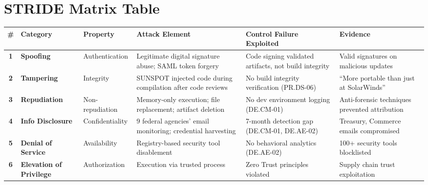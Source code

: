 \clearpage
\section{STRIDE Matrix Table}
\label{app:stride}

\begin{table}[h] %
    \centering
    \small
    \renewcommand{\arraystretch}{1.3}
    \begin{tabularx}{\textwidth}{>{\bfseries}c >{\bfseries}l l X X X}
        \toprule
        \# & Category & Property & Attack Element & Control Failure Exploited & Evidence \\
        \midrule
        1 & Spoofing & Authentication & Legitimate digital signature abuse; SAML token forgery & Code signing validated artifacts, not build integrity & Valid signatures on malicious updates \cite{fireeye_highly_2020} \\
        
        2 & Tampering & Integrity & SUNSPOT injected code during compilation after code reviews & No build integrity verification (PR.DS-06) & ``More portable than just at SolarWinds'' \cite{us_open_2021} \\
        
        3 & Repudiation & Non-repudiation & Memory-only execution; file replacement; artifact deletion & No dev environment logging (DE.CM-01) & Anti-forensic techniques prevented attribution \cite{fireeye_highly_2020} \\
        
        4 & Info Disclosure & Confidentiality & 9 federal agencies' email monitoring; credential harvesting & 7-month detection gap (DE.CM-01, DE.AE-02) & Treasury, Commerce emails compromised \cite{nagle_solarwinds_2023} \\
        
        5 & Denial of Service & Availability & Registry-based security tool disablement & No behavioral analytics (DE.AE-02) & 100+ security tools blocklisted \cite{eckels_sunburst_2020} \\
        
        6 & Elevation of Privilege & Authorization & Execution via trusted process & Zero Trust principles violated \cite{rose_zero_2020} & Supply chain trust exploitation \cite{fireeye_highly_2020} \\
        \bottomrule
    \end{tabularx}
\end{table}
